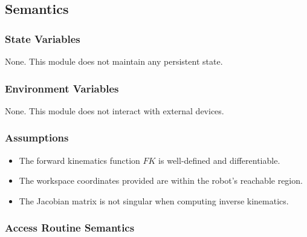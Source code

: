 \documentclass[12pt, titlepage]{article}
\begin{document}
\subsection{Semantics}

\subsubsection{State Variables}

None. This module does not maintain any persistent state.

\subsubsection{Environment Variables}

None. This module does not interact with external devices.

\subsubsection{Assumptions}

\begin{itemize}
    \item The forward kinematics function \( FK \) is well-defined and differentiable.
    \item The workspace coordinates provided are within the robot’s reachable region.
    \item The Jacobian matrix is not singular when computing inverse kinematics.
\end{itemize}

\subsubsection{Access Routine Semantics}
\end{document}
